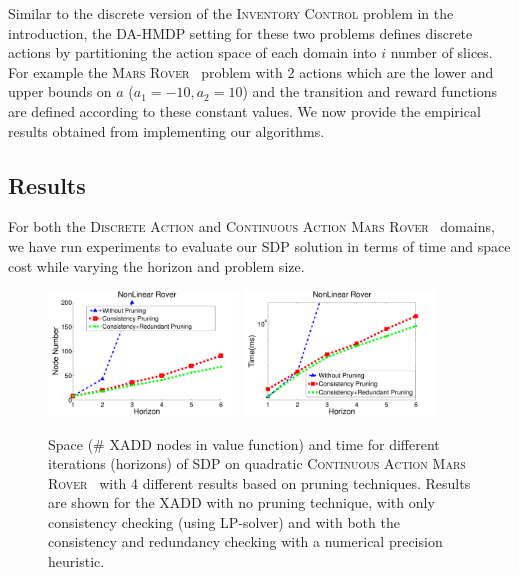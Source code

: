 \documentclass[twoside,11pt]{article}
\newcommand{\MarsRover}{\textsc{Mars Rover }}
\newcommand{\InventoryControl}{\textsc{Inventory Control }}
\begin{document}
Similar to the discrete version of the \InventoryControl problem in the introduction, the DA-HMDP setting for these two problems defines discrete actions by partitioning the action space of each domain into $i$ number of slices. For example the \MarsRover\ problem with 2 actions which are the lower and upper bounds on $a$ ($a_1=-10, a_2 = 10$) and the transition and reward functions are defined according to these constant values.
We now provide the empirical results obtained from implementing our algorithms.

\subsection{Results}

For both the \textsc{Discrete Action} and \textsc{Continuous Action} \MarsRover\ domains, 
we have run experiments to evaluate our SDP solution 
in terms of time and space cost while varying the horizon and problem size.

\begin{figure}[t]
\centering
\includegraphics[width=0.45\textwidth]{pics/contRoverNode2.pdf}
\includegraphics[width=0.45\textwidth]{pics/contRoverTime2.pdf}
\vspace{-3mm}
\caption{%
Space (\# XADD nodes in value function) and
time for different iterations (horizons) of SDP on quadratic \textsc{Continuous Action}  \MarsRover\ with 4 different results based on pruning techniques. Results are shown for  the XADD 
 with no pruning technique, with only consistency checking (using LP-solver) and with both the consistency and redundancy checking with a numerical precision heuristic.} %
\label{fig:roverTS}
\end{figure}
\end{document}

